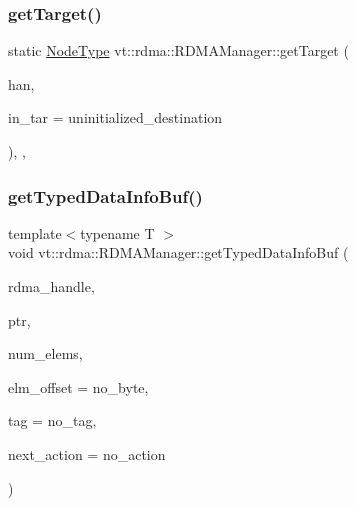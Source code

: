 \subsubsection{\texorpdfstring{get\+Target()}{getTarget()}}
{\footnotesize\ttfamily static \hyperlink{namespacevt_a866da9d0efc19c0a1ce79e9e492f47e2}{Node\+Type} vt\+::rdma\+::\+R\+D\+M\+A\+Manager\+::get\+Target (\begin{DoxyParamCaption}\item[{\hyperlink{namespacevt_a10442579ec4e7ebef223818e64bcf908}{R\+D\+M\+A\+\_\+\+Handle\+Type} const \&}]{han,  }\item[{\hyperlink{namespacevt_a866da9d0efc19c0a1ce79e9e492f47e2}{Node\+Type} const \&}]{in\+\_\+tar = {\ttfamily uninitialized\+\_\+destination} }\end{DoxyParamCaption})\hspace{0.3cm}{\ttfamily [inline]}, {\ttfamily [static]}, {\ttfamily [private]}}

\mbox{\label{structvt_1_1rdma_1_1_r_d_m_a_manager_a267d1a2da52abf259119da964b9051f0}} 
\subsubsection{\texorpdfstring{get\+Typed\+Data\+Info\+Buf()}{getTypedDataInfoBuf()}\hspace{0.1cm}{\footnotesize\ttfamily [1/2]}}
{\footnotesize\ttfamily template$<$typename T $>$ \\
void vt\+::rdma\+::\+R\+D\+M\+A\+Manager\+::get\+Typed\+Data\+Info\+Buf (\begin{DoxyParamCaption}\item[{\hyperlink{namespacevt_a10442579ec4e7ebef223818e64bcf908}{R\+D\+M\+A\+\_\+\+Handle\+Type} const \&}]{rdma\+\_\+handle,  }\item[{T}]{ptr,  }\item[{\hyperlink{namespacevt_aab8d55968084610ce3b17057981e9300}{Byte\+Type} const \&}]{num\+\_\+elems,  }\item[{\hyperlink{namespacevt_aab8d55968084610ce3b17057981e9300}{Byte\+Type} const \&}]{elm\+\_\+offset = {\ttfamily no\+\_\+byte},  }\item[{\hyperlink{namespacevt_a84ab281dae04a52a4b243d6bf62d0e52}{Tag\+Type} const \&}]{tag = {\ttfamily no\+\_\+tag},  }\item[{\hyperlink{namespacevt_ae0a5a7b18cc99d7b732cb4d44f46b0f3}{Action\+Type}}]{next\+\_\+action = {\ttfamily no\+\_\+action} }\end{DoxyParamCaption})\hspace{0.3cm}{\ttfamily [inline]}}



